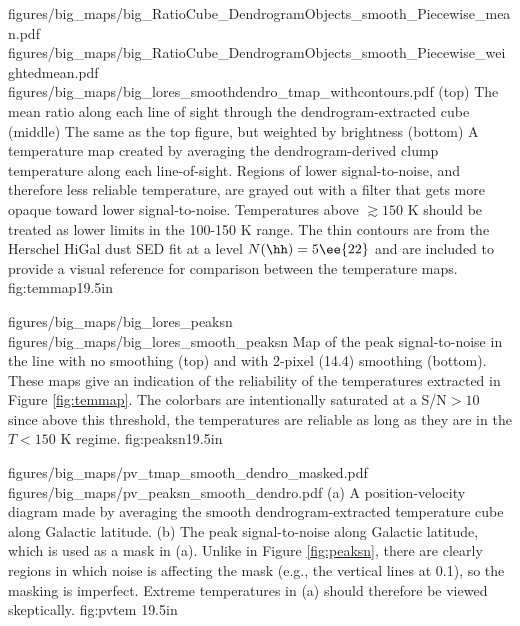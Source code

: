 \RotFigureThreeAA
{figures/big_maps/big_RatioCube_DendrogramObjects_smooth_Piecewise_mean.pdf}
{figures/big_maps/big_RatioCube_DendrogramObjects_smooth_Piecewise_weightedmean.pdf}
{figures/big_maps/big_lores_smoothdendro_tmap_withcontours.pdf}
{(top) The mean ratio along each line of sight through the dendrogram-extracted
cube
\newline
(middle) The same as the top figure, but weighted by \threeohthree brightness
\newline
(bottom) 
A temperature map created by averaging the dendrogram-derived clump temperature
along each line-of-sight.
Regions of lower signal-to-noise, and therefore less
reliable temperature, are grayed out with a filter that gets more opaque
toward lower signal-to-noise.  Temperatures above $\gtrsim150$ K should be
treated as lower limits in the 100-150 K range.
The thin contours are from the Herschel HiGal dust SED fit at a level $N(\hh)=5\ee{22}$
and are included to provide a visual reference for comparison between the temperature
maps.
}
{fig:temmap}{1}{9.5in}

\RotFigureTwoAA
{figures/big_maps/big_lores_peaksn}
{figures/big_maps/big_lores_smooth_peaksn}
{Map of the peak signal-to-noise in the \para \threeohthree line with no
smoothing (top) and with 2-pixel (14.4\arcsec) smoothing (bottom).  
These maps give an indication of the reliability of the temperatures extracted
in Figure \ref{fig:temmap}.  The colorbars are intentionally saturated at a
S/N$>10$ since above this threshold, the temperatures are reliable as long as
they are in the $T<150$ K regime.
}
{fig:peaksn}{1}{9.5in}



\RotFigureTwoAA
{figures/big_maps/pv_tmap_smooth_dendro_masked.pdf}
{figures/big_maps/pv_peaksn_smooth_dendro.pdf}
{(a) A position-velocity diagram made by averaging the smooth
dendrogram-extracted temperature cube along Galactic latitude.  (b) The peak
signal-to-noise along Galactic latitude, which is used as a mask in (a).
Unlike in Figure \ref{fig:peaksn}, there are clearly regions in which noise is
affecting the mask (e.g., the vertical lines at 0.1\arcdeg), so the masking is
imperfect.  Extreme temperatures in (a) should therefore be viewed
skeptically.}
{fig:pvtem}
{1}{9.5in}

